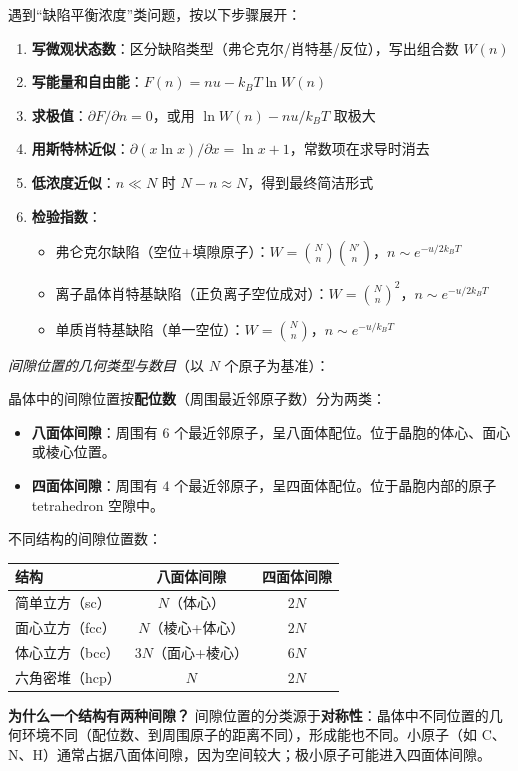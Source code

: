 \begin{thinkbox}
遇到``缺陷平衡浓度''类问题，按以下步骤展开：
\begin{enumerate}
    \item \textbf{写微观状态数}：区分缺陷类型（弗仑克尔/肖特基/反位），写出组合数 $W(n)$
    \item \textbf{写能量和自由能}：$F(n) = nu - k_{\!B}T\ln W(n)$
    \item \textbf{求极值}：$\partial F/\partial n = 0$，或用 $\ln W(n) - nu/k_{\!B}T$ 取极大
    \item \textbf{用斯特林近似}：$\partial(x\ln x)/\partial x = \ln x + 1$，常数项在求导时消去
    \item \textbf{低浓度近似}：$n\ll N$ 时 $N-n\approx N$，得到最终简洁形式
    \item \textbf{检验指数}：
    \begin{itemize}
        \item 弗仑克尔缺陷（空位+填隙原子）：$W=\binom{N}{n}\binom{N'}{n}$，$n\sim e^{-u/2k_{\!B}T}$
        \item 离子晶体肖特基缺陷（正负离子空位成对）：$W=\binom{N}{n}^2$，$n\sim e^{-u/2k_{\!B}T}$
        \item 单质肖特基缺陷（单一空位）：$W=\binom{N}{n}$，$n\sim e^{-u/k_{\!B}T}$
    \end{itemize}
\end{enumerate}
\textit{间隙位置的几何类型与数目}（以 $N$ 个原子为基准）：

晶体中的间隙位置按\textbf{配位数}（周围最近邻原子数）分为两类：
\begin{itemize}
    \item \textbf{八面体间隙}：周围有 $6$ 个最近邻原子，呈八面体配位。位于晶胞的体心、面心或棱心位置。
    \item \textbf{四面体间隙}：周围有 $4$ 个最近邻原子，呈四面体配位。位于晶胞内部的原子 tetrahedron 空隙中。
\end{itemize}

不同结构的间隙位置数：
\begin{center}
\begin{tabular}{lcc}
\toprule
\textbf{结构} & \textbf{八面体间隙} & \textbf{四面体间隙} \\
\midrule
简单立方（sc） & $N$（体心） & $2N$ \\
面心立方（fcc） & $N$（棱心+体心） & $2N$ \\
体心立方（bcc） & $3N$（面心+棱心） & $6N$ \\
六角密堆（hcp） & $N$ & $2N$ \\
\bottomrule
\end{tabular}
\end{center}
\vspace{2pt}
\textbf{为什么一个结构有两种间隙？} 间隙位置的分类源于\textbf{对称性}：晶体中不同位置的几何环境不同（配位数、到周围原子的距离不同），形成能也不同。小原子（如 C、N、H）通常占据八面体间隙，因为空间较大；极小原子可能进入四面体间隙。


\end{thinkbox}

